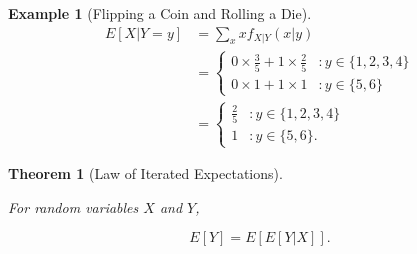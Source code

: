 \documentclass[
]{article}
\newtheorem{theorem}{Theorem}[section]
\theoremstyle{definition}
\theoremstyle{definition}
\newtheorem{example}{Example}[section]
\theoremstyle{definition}
\theoremstyle{remark}
\begin{document}
\begin{example}[Flipping a Coin and Rolling a Die]
\begin{align}
E[X | Y=y] &= \sum_x xf_{X|Y}(x|y) \\
           &= \begin{cases} 0 \times \frac{3}{5} + 1 \times \frac{2}{5} &: y \in \{1,2,3,4\} \\ 
                            0 \times 1 + 1 \times 1 &: y \in \{5,6\}
                            \end{cases} \\
           &= \begin{cases} \frac{2}{5} &:  y \in \{1,2,3,4\} \\ 
                            1 &: y \in \{5,6\}. 
                            \end{cases}
\end{align}

\end{example}

\begin{theorem}[Law of Iterated Expectations]
\protect\hypertarget{thm:unlabeled-div-97}{}\label{thm:unlabeled-div-97}

For random variables \(X\) and \(Y\),

\[E[Y] = E[E[Y|X]].\]

\end{theorem}
\end{document}
